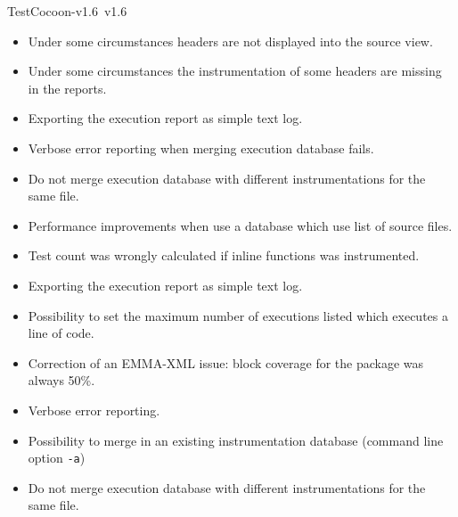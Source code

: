 \begin{TestCocoonDownload}
\begin{ReleaseNote}{TestCocoon-v1.6}{\TestCocoon\ v1.6}
\begin{description}
  \begin{itemize}
    \item \BugFix     Under some circumstances headers are not displayed into the source view.
    \item \BugFix     Under some circumstances the instrumentation of some headers are missing in the reports.
    \item \NewFeature Exporting the execution report as simple text log.
    \item \NewFeature Verbose error reporting when merging execution database fails.
    \item \BugFix     Do not merge execution database with different instrumentations for the same file.
    \item \Profiling  Performance improvements when use a database which use list of source files.
    \item \BugFix     Test count was wrongly calculated if inline functions was instrumented.
  \end{itemize}
\item[\cmreport]
  \begin{itemize}
    \item \NewFeature Exporting the execution report as simple text log.
    \item \NewFeature Possibility to set the maximum number of executions listed which executes a line of code.
    \item \BugFix Correction of an EMMA-XML issue: block coverage for the package was always 50\%.
  \end{itemize}
\item[\cmmerge]
  \begin{itemize}
    \item \NewFeature Verbose error reporting.
    \item \NewFeature Possibility to merge in an existing instrumentation database (command line option \verb$-a$)
    \item \BugFix     Do not merge execution database with different instrumentations for the same file.
  \end{itemize}
\end{description}
\end{ReleaseNote}
\end{TestCocoonDownload}



